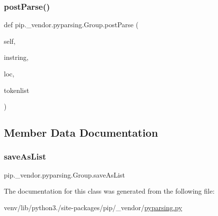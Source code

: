 \subsubsection{\texorpdfstring{post\+Parse()}{postParse()}}
{\footnotesize\ttfamily def pip.\+\_\+vendor.\+pyparsing.\+Group.\+post\+Parse (\begin{DoxyParamCaption}\item[{}]{self,  }\item[{}]{instring,  }\item[{}]{loc,  }\item[{}]{tokenlist }\end{DoxyParamCaption})}



\subsection{Member Data Documentation}
\mbox{\label{classpip_1_1__vendor_1_1pyparsing_1_1Group_ae6bf892b1fc18d728968e384cd903ee2}} 
\subsubsection{\texorpdfstring{save\+As\+List}{saveAsList}}
{\footnotesize\ttfamily pip.\+\_\+vendor.\+pyparsing.\+Group.\+save\+As\+List}



The documentation for this class was generated from the following file\+:\begin{DoxyCompactItemize}
\item 
venv/lib/python3./site-\/packages/pip/\+\_\+vendor/\hyperlink{pip_2__vendor_2pyparsing_8py}{pyparsing.\+py}\end{DoxyCompactItemize}
